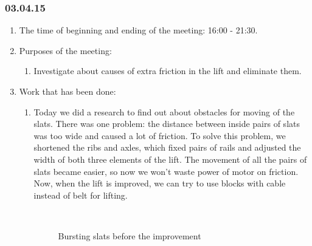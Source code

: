 \subsubsection{03.04.15}
\begin{enumerate}
	
	\item The time of beginning and ending of the meeting: 16:00 - 21:30.
	
	\item Purposes of the meeting: 
	\begin{enumerate}
		
		\item Investigate about causes of extra friction in the lift and eliminate them.
		
	\end{enumerate}

	\item Work that has been done:
	\begin{enumerate}
		
		\item Today we did a research to find out about obstacles for moving of the slats. There was one problem: the distance between inside pairs of slats was too wide and caused a lot of friction. To solve this problem, we shortened the ribs and axles, which fixed pairs of rails and adjusted the width of both three elements of the lift. The movement of all the pairs of slats became easier, so now we won't waste power of motor on friction. Now, when the lift is improved, we can try to use blocks with cable instead of belt for lifting.
        \begin{figure}[H]
	  	  \begin{minipage}[h]{0.2\linewidth}
	  	    \center  
	  	  \end{minipage}
	  	  \begin{minipage}[h]{0.6\linewidth}
	  		\caption{Bursting slats before the improvement}
	  	  \end{minipage}
	   \end{figure}
	   

\end{enumerate}
\end{enumerate}
